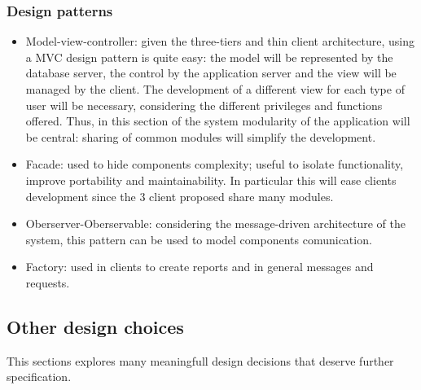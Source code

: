 \subsubsection{Design patterns}
\begin{itemize}
	\item Model-view-controller: given the three-tiers and thin client architecture, using a MVC design pattern is quite easy: the model will be represented by the database server, the control by the application server and the view will be managed by the client. \newline
	The development of a different view for each type of user will be necessary, considering the different privileges and functions offered. Thus, in this section of the system modularity of the application will be central: sharing of common modules will simplify the development. 
	\item Facade: used to hide components complexity; useful to isolate functionality, improve portability and maintainability. In particular this will ease clients development since the 3 client proposed share many modules.
	\item Oberserver-Oberservable: considering the message-driven architecture of the system, this pattern can be used to model components comunication.
	\item Factory: used in clients to create reports and in general messages and requests.
\end{itemize}

\subsection{Other design choices}
This sections explores many meaningfull design decisions that deserve further specification.

